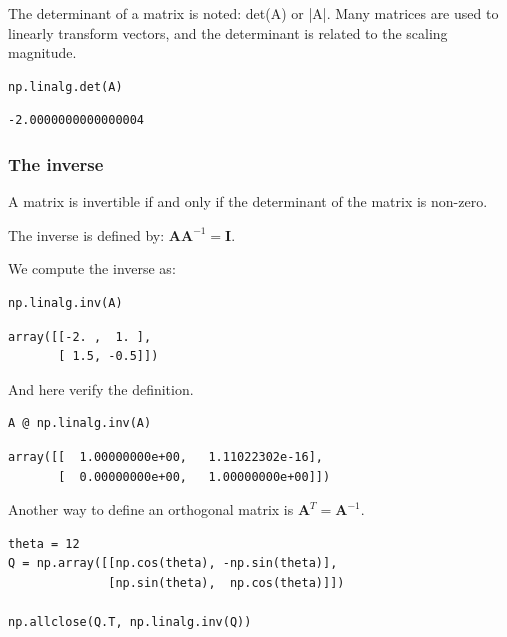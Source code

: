 \documentclass[11pt]{article}
\begin{document}
The determinant of a matrix is noted: det(A) or |A|. Many matrices are used to linearly transform vectors, and the determinant is related to the scaling magnitude.

\begin{verbatim}
np.linalg.det(A)
\end{verbatim}

\begin{verbatim}
-2.0000000000000004
\end{verbatim}

\subsubsection{The inverse}
\label{sec:orga8eb739}

A matrix is invertible if and only if the determinant of the matrix is non-zero.

The inverse is defined by: \(\mathbf{A} \mathbf{A}^{-1} = \mathbf{I}\).

We compute the inverse as:

\begin{verbatim}
np.linalg.inv(A)
\end{verbatim}

\begin{verbatim}
array([[-2. ,  1. ],
       [ 1.5, -0.5]])
\end{verbatim}

And here verify the definition.

\begin{verbatim}
A @ np.linalg.inv(A)
\end{verbatim}

\begin{verbatim}
array([[  1.00000000e+00,   1.11022302e-16],
       [  0.00000000e+00,   1.00000000e+00]])
\end{verbatim}

Another way to define an orthogonal matrix is \(\mathbf{A}^T = \mathbf{A}^{-1}\).

\begin{verbatim}
theta = 12
Q = np.array([[np.cos(theta), -np.sin(theta)],
              [np.sin(theta),  np.cos(theta)]])

np.allclose(Q.T, np.linalg.inv(Q))
\end{verbatim}
\end{document}
